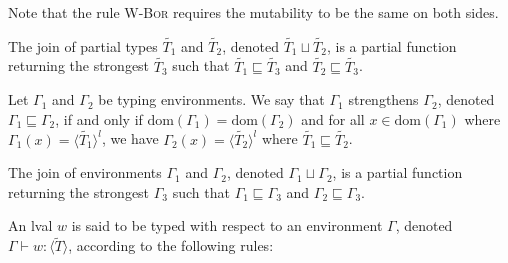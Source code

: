 \begin{subappendices}
\begin{mathpar}
    
    
    
    
\end{mathpar}
Note that the rule \textsc{W-Bor} requires the mutability to be the same on both sides.
\begin{definition} The join of partial types $\widetilde{T_1}$ and $\widetilde{T_2}$, denoted $\widetilde{T_1} \sqcup \widetilde{T_2}$, is a partial function returning the strongest $\widetilde{T_3}$ such that $\widetilde{T_1} \sqsubseteq \widetilde{T_3}$ and $\widetilde{T_2} \sqsubseteq \widetilde{T_3}$.
\end{definition}
\begin{definition} Let $\Gamma_1$ and $\Gamma_2$ be typing environments. We say that $\Gamma_1$ strengthens $\Gamma_2$, denoted $\Gamma_1 \sqsubseteq \Gamma_2$, if and only if $\mathrm{dom}(\Gamma_1) = \mathrm{dom}(\Gamma_2)$ and for all $x \in \mathrm{dom}(\Gamma_1)$ where $\Gamma_1(x) = \langle \widetilde{T_1} \rangle^l$, we have $\Gamma_2(x) = \langle \widetilde{T_2} \rangle^l$ where $\widetilde{T_1} \sqsubseteq \widetilde{T_2}$.
\end{definition}
\begin{definition} The join of environments $\Gamma_1$ and $\Gamma_2$, denoted $\Gamma_1 \sqcup \Gamma_2$, is a partial function returning the strongest $\Gamma_3$ such that $\Gamma_1 \sqsubseteq \Gamma_3$ and $\Gamma_2 \sqsubseteq \Gamma_3$.
\end{definition}
\begin{definition} An lval $w$ is said to be typed with respect to an environment $\Gamma$, denoted $\Gamma \vdash w : \langle \widetilde{T}\rangle$, according to the following rules:
\end{definition}
\vspace{-2.0em}
\begin{mathpar}


\end{mathpar}
\end{subappendices}
